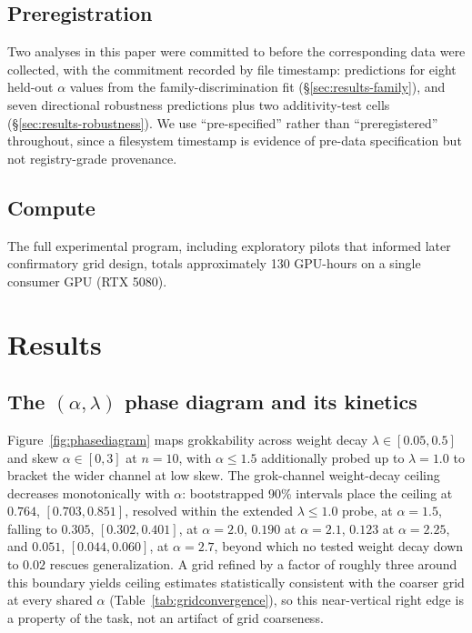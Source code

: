 \documentclass[11pt]{article}
\begin{document}
\subsection{Preregistration}
Two analyses in this paper were committed to before the corresponding data were collected, with the commitment recorded by file timestamp: predictions for eight held-out $\alpha$ values from the family-discrimination fit (\S\ref{sec:results-family}), and seven directional robustness predictions plus two additivity-test cells (\S\ref{sec:results-robustness}). We use ``pre-specified'' rather than ``preregistered'' throughout, since a filesystem timestamp is evidence of pre-data specification but not registry-grade provenance.

\subsection{Compute}
The full experimental program, including exploratory pilots that informed later confirmatory grid design, totals approximately 130 GPU-hours on a single consumer GPU (RTX 5080).

\section{Results}

\subsection{The $(\alpha,\lambda)$ phase diagram and its kinetics}
\label{sec:results-map}

Figure~\ref{fig:phasediagram} maps grokkability across weight decay $\lambda\in[0.05,0.5]$ and skew $\alpha\in[0,3]$ at $n=10$, with $\alpha\le1.5$ additionally probed up to $\lambda=1.0$ to bracket the wider channel at low skew. The grok-channel weight-decay ceiling decreases monotonically with $\alpha$: bootstrapped 90\% intervals place the ceiling at $0.764$, $[0.703,0.851]$, resolved within the extended $\lambda\le1.0$ probe, at $\alpha=1.5$, falling to $0.305$, $[0.302,0.401]$, at $\alpha=2.0$, $0.190$ at $\alpha=2.1$, $0.123$ at $\alpha=2.25$, and $0.051$, $[0.044,0.060]$, at $\alpha=2.7$, beyond which no tested weight decay down to $0.02$ rescues generalization. A grid refined by a factor of roughly three around this boundary yields ceiling estimates statistically consistent with the coarser grid at every shared $\alpha$ (Table~\ref{tab:gridconvergence}), so this near-vertical right edge is a property of the task, not an artifact of grid coarseness.
\end{document}
